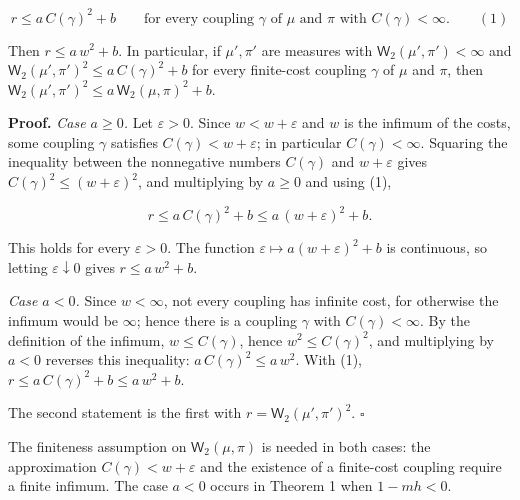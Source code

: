 \documentclass[11pt,a4paper]{report}
\begin{document}
\[r\le a\,C(\gamma)^2+b\qquad\text{for every coupling }\gamma\text{ of }\mu\text{ and }\pi\text{ with }C(\gamma)<\infty.\qquad(1)\]


Then \(r\le a\,w^2+b\). In particular, if \(\mu',\pi'\) are measures with \(\mathsf W_2(\mu',\pi')<\infty\) and \(\mathsf W_2(\mu',\pi')^2\le a\,C(\gamma)^2+b\) for every finite-cost coupling \(\gamma\) of \(\mu\) and \(\pi\), then \(\mathsf W_2(\mu',\pi')^2\le a\,\mathsf W_2(\mu,\pi)^2+b\).




\textbf{Proof.} \emph{Case \(a\ge0\).} Let \(\varepsilon>0\). Since \(w<w+\varepsilon\) and \(w\) is the infimum of the costs, some coupling \(\gamma\) satisfies \(C(\gamma)<w+\varepsilon\); in particular \(C(\gamma)<\infty\). Squaring the inequality between the nonnegative numbers \(C(\gamma)\) and \(w+\varepsilon\) gives \(C(\gamma)^2\le(w+\varepsilon)^2\), and multiplying by \(a\ge0\) and using (1),


\[r\le a\,C(\gamma)^2+b\le a\,(w+\varepsilon)^2+b.\]


This holds for every \(\varepsilon>0\). The function \(\varepsilon\mapsto a(w+\varepsilon)^2+b\) is continuous, so letting \(\varepsilon\downarrow0\) gives \(r\le a\,w^2+b\).




\emph{Case \(a<0\).} Since \(w<\infty\), not every coupling has infinite cost, for otherwise the infimum would be \(\infty\); hence there is a coupling \(\gamma\) with \(C(\gamma)<\infty\). By the definition of the infimum, \(w\le C(\gamma)\), hence \(w^2\le C(\gamma)^2\), and multiplying by \(a<0\) reverses this inequality: \(a\,C(\gamma)^2\le a\,w^2\). With (1), \(r\le a\,C(\gamma)^2+b\le a\,w^2+b\).




The second statement is the first with \(r=\mathsf W_2(\mu',\pi')^2\). \(\square\)




The finiteness assumption on \(\mathsf W_2(\mu,\pi)\) is needed in both cases: the approximation \(C(\gamma)<w+\varepsilon\) and the existence of a finite-cost coupling require a finite infimum. The case \(a<0\) occurs in Theorem 1 when \(1-mh<0\).
\end{document}

